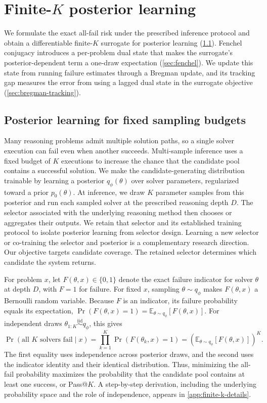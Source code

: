 \section{Finite-\texorpdfstring{$K$}{K} posterior learning}
\label{sec:finite-k}

We formulate the exact all-fail risk under the prescribed inference protocol and obtain a differentiable finite-$K$ surrogate for posterior learning (\cref{sec:problem-setting}).
Fenchel conjugacy introduces a per-problem dual state that makes the surrogate's posterior-dependent term a one-draw expectation (\cref{sec:fenchel}).
We update this state from running failure estimates through a Bregman update, and its tracking gap measures the error from using a lagged dual state in the surrogate objective (\cref{sec:bregman-tracking}).

\subsection{Posterior learning for fixed sampling budgets}
\label{sec:problem-setting}

Many reasoning problems admit multiple solution paths, so a single solver execution can fail even when another succeeds.
Multi-sample inference uses a fixed budget of $K$ executions to increase the chance that the candidate pool contains a successful solution.
We make the candidate-generating distribution trainable by learning a posterior $q_\phi(\theta)$ over solver parameters, regularized toward a prior $p_0(\theta)$.
At inference, we draw $K$ parameter samples from this posterior and run each sampled solver at the prescribed reasoning depth $D$.
The selector associated with the underlying reasoning method then chooses or aggregates their outputs.
We retain that selector and its established training protocol to isolate posterior learning from selector design.
Learning a new selector or co-training the selector and posterior is a complementary research direction.
Our objective targets candidate coverage.
The retained selector determines which candidate the system returns.

For problem $x$, let $F(\theta,x)\in\{0,1\}$ denote the exact failure indicator for solver $\theta$ at depth $D$, with $F=1$ for failure.
For fixed $x$, sampling $\theta\sim q_\phi$ makes $F(\theta,x)$ a Bernoulli random variable.
Because $F$ is an indicator, its failure probability equals its expectation, $\Pr(F(\theta,x)=1)=\mathbb E_{\theta\sim q_\phi}[F(\theta,x)]$.
For independent draws $\theta_{1:K}\overset{\mathrm{iid}}{\sim}q_\phi$, this gives
\begin{equation}
  \Pr(\text{all $K$ solvers fail}\mid x)
  =
  \prod_{k=1}^K
  \Pr\!\left(F(\theta_k,x)=1\right)
  =
  \left(
    \mathbb E_{\theta\sim q_\phi}[F(\theta,x)]
  \right)^K.
  \label{eq:binary-all-fail}
\end{equation}
The first equality uses independence across posterior draws, and the second uses the indicator identity and their identical distribution.
Thus, minimizing the all-fail probability maximizes the probability that the candidate pool contains at least one success, or Pass@$K$.
A step-by-step derivation, including the underlying probability space and the role of independence, appears in \cref{app:finite-k-details}.

